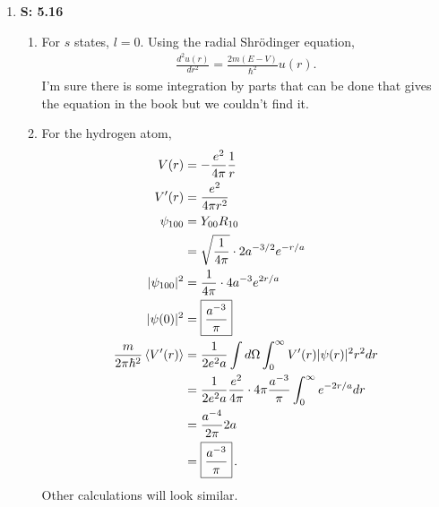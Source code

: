 \documentclass[12pt, letterpaper]{article}
\begin{document}
\begin{enumerate}
    
\item[] \textbf{S: 5.16}
\begin{enumerate}
\item 
For $s$ states, $l=0$. Using the radial Shr\"{o}dinger equation,
\begin{align}
\frac{d^2 u(r)}{dr^2} = \frac{2m(E-V)}{\hbar^2}u(r).
\end{align}
I'm sure there is some integration by parts that can be done that gives the equation in the book but we couldn't find it.
\item
For the hydrogen atom,
\begin{align}
V(r) &= -\frac{e^2}{4\pi}\frac{1}{r}\\
V'(r) &= \frac{e^2}{4\pi r^2}\\
\psi_{100} &= Y_{00}R_{10}\\
&= \sqrt{\frac{1}{4\pi}}\cdot 2a^{-3/2}e^{-r/a}\\
|\psi_{100}|^2 &= \frac{1}{4\pi}\cdot 4a^{-3}e^{2r/a}\\
|\psi(0)|^2 &= \boxed{\frac{a^{-3}}{\pi}}\\
\frac{m}{2\pi\hbar^2}\braket{V'(r)} &= \frac{1}{2e^2a}\int d\Omega\int_0^\infty 
V'(r)|\psi(r)|^2r^2dr\\
&= \frac{1}{2e^2a}\frac{e^2}{4\pi}\cdot 4\pi \frac{a^{-3}}{\pi}
\int_0^\infty e^{-2r/a}dr\\
&= \frac{a^{-4}}{2\pi}2a\\
&= \boxed{\frac{a^{-3}}{\pi}}\hspace{.5mm}.
\end{align}
Other calculations will look similar.
\end{enumerate}
    
    

\end{enumerate}
\end{document}
